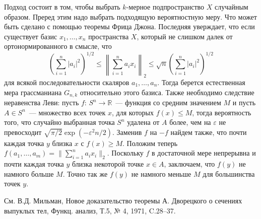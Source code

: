 \begin{ordre}
Подход состоит в том, чтобы выбрать $k$-мерное подпространство $X$ случайным образом. Преред этим надо выбрать подходящую вероятностную меру. Что может быть сделано с помощью теоремы Фрица Джона. Последняя уверждает, что если существует базис $x_1,\dots,x_n$ пространства $X$, который не слишком далек от ортонормированного в смысле, что 
$$
\left(\sum_{i=1}^n|a_i|^2\right)^{1/2}\leq \left\|\sum_{i=1}^n a_ix_i\right\|_2\leq \sqrt{n}\left(\sum_{i=1}^n|a_i|^2\right)^{1/2}
$$
для всякой последовательности скаляров $a_1,\dots,a_n$. Тогда берется естественная мера грассманиана $G_{n,k}$ относительно этого базиса. Также необходимо следствие неравенства Леви: пусть $f:\,S^n\to\mathbb{R}$~--- функция со средним значением $M$ и пусть $A\in S^n$~--- множество всех точек $x$, для которых $f(x)\leq M$, тогда вероятность того, что случайно выбранная точка $S^n$ удалена от $A$ более, чем на $\varepsilon$ не превосходит $\sqrt{\pi/2}\exp(-\varepsilon^2n/2)$. Заменив $f$ на $-f$ найдем также, что почти каждая точка $y$ близка $x$ с $f(x)\geq M$. Положим теперь $f(a_1,\dots,a_m) = \|\sum_{i=1}^n a_ix_i\|_2$. Поскольку $f$ в достаточной мере непрерывна и почти каждая точка $y$ близка некоторой точке $x\in A$, заключаем, что $f(y)$ не намного больше $M$. Точно так же $f(y)$ не намного меньше $M$ для большинства точек $y$. 

См. В.Д. Мильман, Новое доказательство теоремы А. Дворецкого о сечениях выпуклых тел, Функц. анализ, Т.5, № 4, 1971, C.28--37.
\end{ordre}

